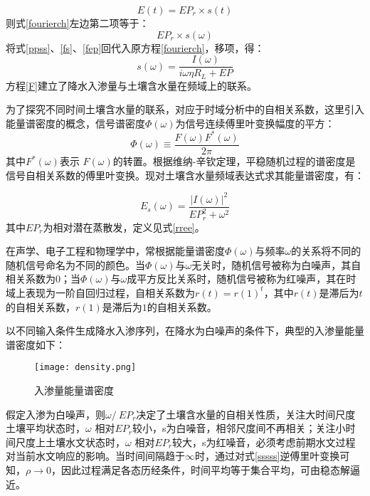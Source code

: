 \begin{equation}
E(t)=EP_r\times  s(t)
\end{equation}
则式\ref{fourierch}左边第二项等于：
\begin{equation}
\label{fep}
EP_r\times s(\omega)
\end{equation}
将式\ref{ppss}、\ref{fs}、\ref{fep}回代入原方程\ref{fourierch}，移项，得：
\begin{equation}
\label{F}
s(\omega )=\frac{I(\omega )}{i\omega \eta R_L+EP}
\end{equation}
方程\ref{F}建立了降水入渗量与土壤含水量在频域上的联系。

为了探究不同时间土壤含水量的联系，对应于时域分析中的自相关系数，这里引入能量谱密度的概念，信号谱密度$\Phi (\omega )$为信号连续傅里叶变换幅度的平方：
\begin{equation}
\Phi(\omega) \equiv  \frac{F(\omega)F^*(\omega)}{2\pi}
\end{equation}
其中$F^*(\omega)$表示 $F(\omega)$的转置。根据维纳-辛钦定理，平稳随机过程的谱密度是信号自相关系数的傅里叶变换。现对土壤含水量频域表达式求其能量谱密度，有：

\begin{equation}
E_s (\omega)=\frac{|I(\omega)|^2}{EP_r ^2+\omega ^2}
\label{sssss}
\end{equation}
其中$EP_r$为相对潜在蒸散发，定义见式\ref{rree}。

在声学、电子工程和物理学中，常根据能量谱密度$\Phi(\omega)$与频率$\omega $的关系将不同的随机信号命名为不同的颜色。当$\Phi(\omega)$与$\omega $无关时，随机信号被称为白噪声，其自相关系数为$0$；当$\Phi(\omega)$与$\omega $成平方反比关系时，随机信号被称为红噪声，其在时域上表现为一阶自回归过程，自相关系数为$r(t)=r(1)^t$，其中$r(t)$是滞后为$t$的自相关系数，$r(1)$是滞后为$1$的自相关系数。
 
以不同输入条件生成降水入渗序列，在降水为白噪声的条件下，典型的入渗量能量谱密度如下：
\begin{figure}[H]
\centering
\texttt{[image: density.png]}
\caption{入渗量能量谱密度}
\label{ununity}
\end{figure}

假定入渗为白噪声，则$\omega / \ EP_r$决定了土壤含水量的自相关性质，关注大时间尺度土壤平均状态时，$\omega$ 相对$EP_r$较小，s为白噪音，相邻尺度间不再相关；关注小时间尺度上土壤水文状态时，$\omega$ 相对$EP_r$较大，s为红噪音，必须考虑前期水文过程对当前水文响应的影响。当时间间隔趋于$\infty$时，通过对式\ref{sssss}逆傅里叶变换可知，$\rho \to 0$，因此过程满足各态历经条件，时间平均等于集合平均，可由稳态解逼近。

